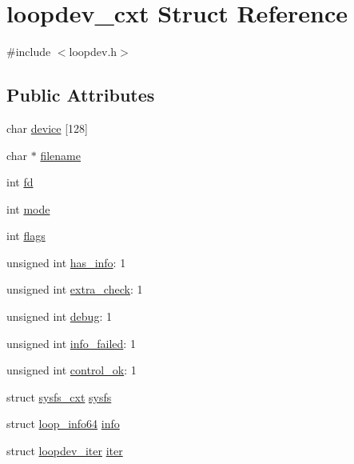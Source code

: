\hypertarget{structloopdev__cxt}{}\section{loopdev\+\_\+cxt Struct Reference}
\label{structloopdev__cxt}


{\ttfamily \#include $<$loopdev.\+h$>$}

\subsection*{Public Attributes}
\begin{DoxyCompactItemize}
\item 
char \hyperlink{structloopdev__cxt_a25b65fcc29dace037a522bf7ffc76071}{device} \mbox{[}128\mbox{]}
\item 
char $\ast$ \hyperlink{structloopdev__cxt_a127b1f4702b4fcccc67d633c0e42d726}{filename}
\item 
int \hyperlink{structloopdev__cxt_a7b18efc96fe789ac4dcf8895d4716b1c}{fd}
\item 
int \hyperlink{structloopdev__cxt_a84ed3dd30a6f97b7deb2910a757589ff}{mode}
\item 
int \hyperlink{structloopdev__cxt_a14746b4e0701d7f01eb93364e3463bff}{flags}
\item 
unsigned int \hyperlink{structloopdev__cxt_ae332fed661241c0c194f86a351cb8e5d}{has\+\_\+info}\+: 1
\item 
unsigned int \hyperlink{structloopdev__cxt_af8169774dbc344343a802a7fee2dec92}{extra\+\_\+check}\+: 1
\item 
unsigned int \hyperlink{structloopdev__cxt_a21c01f73a14af97b3d0de37d98207273}{debug}\+: 1
\item 
unsigned int \hyperlink{structloopdev__cxt_afa35dde0869a906d5557ba88bbe4df5d}{info\+\_\+failed}\+: 1
\item 
unsigned int \hyperlink{structloopdev__cxt_ae529a309ccc0b8d814f2cee17e55d14f}{control\+\_\+ok}\+: 1
\item 
struct \hyperlink{structsysfs__cxt}{sysfs\+\_\+cxt} \hyperlink{structloopdev__cxt_a77c2fc4d86bea224430b83cdade26de5}{sysfs}
\item 
struct \hyperlink{structloop__info64}{loop\+\_\+info64} \hyperlink{structloopdev__cxt_ae710cb127da89f99ef75c35620038f0b}{info}
\item 
struct \hyperlink{structloopdev__iter}{loopdev\+\_\+iter} \hyperlink{structloopdev__cxt_acdf33a98f396c924eec2be67e918434c}{iter}
\end{DoxyCompactItemize}


